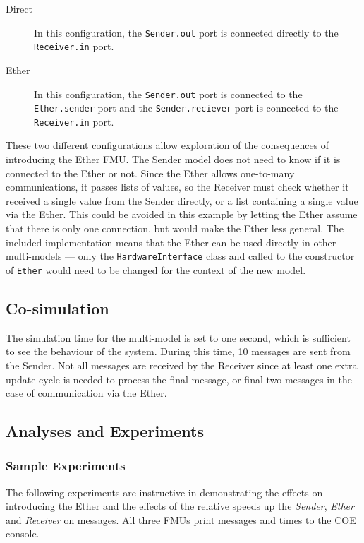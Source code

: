 \begin{description}
  \item[Direct] In this configuration, the \texttt{Sender.out} port is connected directly to the \texttt{Receiver.in} port.
  \item[Ether] In this configuration, the \texttt{Sender.out} port is connected to the \texttt{Ether.sender} port and the \texttt{Sender.reciever} port is connected to the \texttt{Receiver.in} port.
\end{description}

These two different configurations allow exploration of the consequences of introducing the Ether FMU. The Sender model does not need to know if it is connected to the Ether or not. Since the Ether allows one-to-many communications, it passes lists of values, so the Receiver must check whether it received a single value from the Sender directly, or a list containing a single value via the Ether. This could be avoided in this example by letting the Ether assume that there is only one connection, but would make the Ether less general. The included implementation means that the Ether can be used directly in other multi-models --- only the \texttt{HardwareInterface} class and called to the constructor of \texttt{Ether} would need to be changed for the context of the new model.

\subsection{Co-simulation}
\label{sec:ether_into_co}

The simulation time for the multi-model is set to one second, which is sufficient to see the behaviour of the system. During this time, 10 messages are sent from the Sender.  Not all messages are received by the Receiver since at least one extra update cycle is needed to process the final message, or final two messages in the case of communication via the Ether.

\subsection{Analyses and Experiments}
\label{sec:ether_into_analysis}


\subsubsection{Sample Experiments}
\label{sec:ether_exp}

The following experiments are instructive in demonstrating the effects on introducing the Ether and the effects of the relative speeds up the \emph{Sender}, \emph{Ether} and \emph{Receiver} on messages. All three FMUs print messages and times to the COE console.

